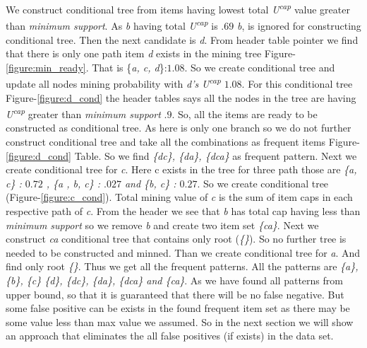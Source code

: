\documentclass[conference]{IEEEtran}
\begin{document}
We construct conditional tree from items having lowest total \emph{U\textsuperscript{cap}} value greater than \emph{minimum support}. As \emph{b} having total \emph{U\textsuperscript{cap}} is $.69$ \emph{b}, is ignored for constructing conditional tree. Then the next candidate is \emph{d}. From header table pointer we find that there is only one path item \emph{d} exists in the mining tree Figure-\ref{figure:min_ready}. That is \{\emph{a, c, d}\}:$1.08$. So we create conditional tree and update all nodes mining probability with \emph{d's} \emph{U\textsuperscript{cap}} $1.08$. For this conditional tree Figure-\ref{figure:d_cond} the header tables says all the nodes in the tree are having \emph{U\textsuperscript{cap}} greater than \emph{minimum support} $.9$. So, all the items are ready to be constructed as conditional tree. As here is only one branch so we do not further construct conditional tree and take all the combinations as frequent items Figure-\ref{figure:d_cond} Table. So we find \emph{\{dc\}, \{da\}, \{dca\}} as frequent pattern. Next we create conditional tree for \emph{c}. Here c exists in the tree for three path those are \emph{\{a, c\} : $0.72$ , \{a , b, c\} : $.027$ and \{b, c\} : $0.27$}. So we create conditional tree (Figure-\ref{figure:c_cond}). Total mining value of \emph{c} is the sum of item caps in each respective path of \emph{c}. From the header we see that \emph{b} has total cap having less than \emph{minimum support} so we remove \emph{b} and create two item set \emph{\{ca\}}. Next we construct \emph{ca} conditional tree that contains only root (\emph{\{\}}). So no further tree is needed to be constructed and minned. Than we create conditional tree for \emph{a}. And find only root \emph{\{\}}. Thus we get all the frequent patterns. All the patterns are \emph{\{a\}, \{b\}, \{c\} \{d\}, \{dc\}, \{da\}, \{dca\} and \{ca\}}. As we have found all patterns from upper bound, so that it is guaranteed that there will be no false negative. But some false positive can be exists in the found frequent item set as there may be some value less than max value we assumed. So in the next section we will show an approach that eliminates the all false positives (if exists) in the data set.
    
    
\end{document}
